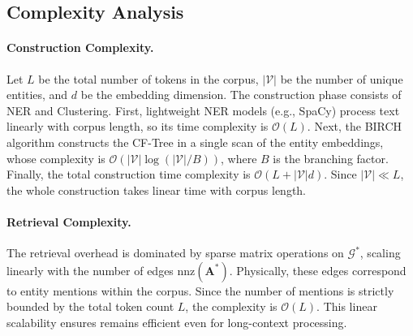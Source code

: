 \subsection{Complexity Analysis}
\label{sec:complexity}
\paragraph{Construction Complexity.} Let $L$ be the total number of tokens in the corpus, $|\mathcal{V}|$ be the number of unique entities, and $d$ be the embedding dimension. The construction phase consists of NER and Clustering. First, lightweight NER models (e.g., SpaCy) process text linearly with corpus length, so its time complexity is $\mathcal{O}(L)$. Next, the BIRCH algorithm constructs the CF-Tree in a single scan of the entity embeddings, whose complexity is $\mathcal{O}(|\mathcal{V}| \log (|\mathcal{V}|/B))$, where $B$ is the branching factor. Finally, the total construction time complexity is $\mathcal{O}(L + |\mathcal{V}|d)$. Since $|\mathcal{V}| \ll L$, the whole construction takes linear time with corpus length.

\paragraph{Retrieval Complexity.}
The retrieval overhead is dominated by sparse matrix operations on $\mathcal{G}^*$, scaling linearly with the number of edges $\text{nnz}(\mathbf{A}^*)$. Physically, these edges correspond to entity mentions within the corpus. Since the number of mentions is strictly bounded by the total token count $L$, the complexity is $\mathcal{O}(L)$. This linear scalability ensures \EHGRAG remains efficient even for long-context processing.
